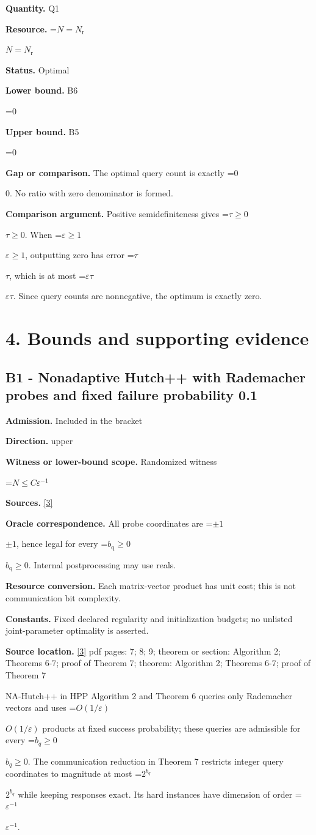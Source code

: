 \documentclass[10pt,a4paper]{article}
\newcommand{\AtlasMath}[1]{\par\begingroup\centering\setbox0=\hbox{$\displaystyle #1$}\ifdim\wd0>1.4\linewidth\typeout{ATLAS WIDE FORMULA: \the\wd0}\fi\ifdim\wd0>\linewidth\resizebox{\linewidth}{!}{\box0}\else\box0\fi\par\endgroup}
\newcommand{\AtlasInlineMath}[1]{\begingroup\setbox0=\hbox{$#1$}\ifdim\wd0>.4\linewidth\endgroup\AtlasMath{#1}\else\endgroup$#1$\fi}
\begin{document}
\textbf{Quantity.} Q1

\textbf{Resource.} \AtlasInlineMath{N=N_{\mathrm{r}}}

\textbf{Status.} Optimal

\textbf{Lower bound.} B6

\AtlasMath{0}
\textbf{Upper bound.} B5

\AtlasMath{0}
\textbf{Gap or comparison.} The optimal query count is exactly \AtlasInlineMath{0}. No ratio with zero denominator is formed.

\textbf{Comparison argument.} Positive semidefiniteness gives \AtlasInlineMath{\tau\ge0}. When \AtlasInlineMath{\varepsilon\ge1}, outputting zero has error \AtlasInlineMath{\tau}, which is at most \AtlasInlineMath{\varepsilon\tau}. Since query counts are nonnegative, the optimum is exactly zero.

\section{4. Bounds and supporting evidence}
\subsection{B1 - Nonadaptive Hutch++ with Rademacher probes and fixed failure probability 0.1}
\textbf{Admission.} Included in the bracket

\textbf{Direction.} upper

\textbf{Witness or lower-bound scope.} Randomized witness

\AtlasMath{N\le C\varepsilon^{-1}}
\textbf{Sources.} \href{https://arxiv.org/pdf/2010.09649v5}{[3]}

\textbf{Oracle correspondence.} All probe coordinates are \AtlasInlineMath{\pm1}, hence legal for every \AtlasInlineMath{b_{\mathrm q}\ge0}. Internal postprocessing may use reals.

\textbf{Resource conversion.} Each matrix-vector product has unit cost; this is not communication bit complexity.

\textbf{Constants.} Fixed declared regularity and initialization budgets; no unlisted joint-parameter optimality is asserted.

\textbf{Source location.} \href{https://arxiv.org/pdf/2010.09649v5}{[3]} pdf pages: 7; 8; 9; theorem or section: Algorithm 2; Theorems 6-7; proof of Theorem 7; theorem: Algorithm 2; Theorems 6-7; proof of Theorem 7

NA-Hutch++ in HPP Algorithm 2 and Theorem 6 queries only Rademacher vectors and uses \AtlasInlineMath{O(1/\varepsilon)} products at fixed success probability; these queries are admissible for every \AtlasInlineMath{b_q\ge0}. The communication reduction in Theorem 7 restricts integer query coordinates to magnitude at most \AtlasInlineMath{2^{b_q}} while keeping responses exact. Its hard instances have dimension of order \AtlasInlineMath{\varepsilon^{-1}}.
\end{document}
